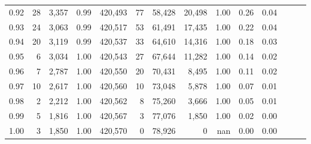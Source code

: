 \begin{tabular}{rrrrrrrrrrrrrr}
0.92 &     28 &  3,357 &  0.99 &  420,493 &       77 &  58,428 &  20,498 &  1.00 &  0.26 &      0.04 \\
0.93 &     24 &  3,063 &  0.99 &  420,517 &       53 &  61,491 &  17,435 &  1.00 &  0.22 &      0.04 \\
0.94 &     20 &  3,119 &  0.99 &  420,537 &       33 &  64,610 &  14,316 &  1.00 &  0.18 &      0.03 \\
0.95 &      6 &  3,034 &  1.00 &  420,543 &       27 &  67,644 &  11,282 &  1.00 &  0.14 &      0.02 \\
0.96 &      7 &  2,787 &  1.00 &  420,550 &       20 &  70,431 &   8,495 &  1.00 &  0.11 &      0.02 \\
0.97 &     10 &  2,617 &  1.00 &  420,560 &       10 &  73,048 &   5,878 &  1.00 &  0.07 &      0.01 \\
0.98 &      2 &  2,212 &  1.00 &  420,562 &        8 &  75,260 &   3,666 &  1.00 &  0.05 &      0.01 \\
0.99 &      5 &  1,816 &  1.00 &  420,567 &        3 &  77,076 &   1,850 &  1.00 &  0.02 &      0.00 \\
1.00 &      3 &  1,850 &  1.00 &  420,570 &        0 &  78,926 &       0 &   nan &  0.00 &      0.00 \\
\bottomrule
\end{tabular}
